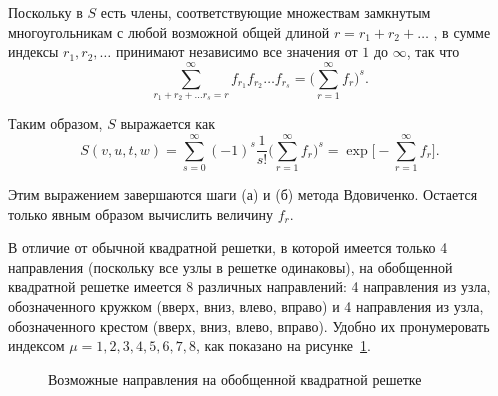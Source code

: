 \documentclass[utf8,12pt]{jetp}
\begin{document}
Поскольку в $S$ есть члены, соответствующие множествам замкнутым многоугольникам с любой возможной общей длиной $r = r_1 + r_2 + \dots$ , в сумме индексы $r_1, r_2, \dots$ принимают независимо все значения от $1$ до $\infty$, так что
\begin{equation*}
	\sum_{r_1 + r_2 + \dots r_s = r}^{\infty} f_{r_1} f_{r_2} \dots f_{r_s} = \bigg(\sum_{r = 1}^{\infty} f_r\bigg)^s.
\end{equation*}

Таким образом, $S$ выражается как
\begin{equation}
	S (v, u, t, w) = \sum_{s = 0}^{\infty} (-1)^s \frac{1}{s!} \bigg(\sum_{r = 1}^{\infty} f_r\bigg)^s = \exp \bigg[- \sum_{r = 1}^{\infty}  f_r \bigg].
	\label{sfunc}
\end{equation}

Этим выражением завершаются шаги (а) и (б) метода Вдовиченко. Остается только явным образом вычислить величину $f_r$. 

В отличие от обычной квадратной решетки, в которой имеется только 4 направления (поскольку все узлы в решетке одинаковы), на обобщенной квадратной решетке имеется 8 различных направлений: 4 направления из узла, обозначенного кружком (вверх, вниз, влево, вправо) и 4 направления из узла, обозначенного крестом (вверх, вниз, влево, вправо). Удобно их пронумеровать индексом $\mu = 1, 2, 3, 4, 5, 6, 7, 8$, как показано на рисунке~\ref{dirgen}.

\begin{figure}[h]
	\caption{Возможные направления на обобщенной квадратной решетке}
	\label{dirgen}
\end{figure}
\end{document}
